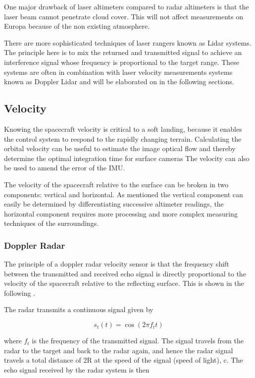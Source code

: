 One major drawback of laser altimeters compared to radar altimeters is that the laser beam cannot penetrate cloud cover. This will not affect measurements on Europa because of the non existing atmosphere. 

There are more sophisticated techniques of laser rangers known as Lidar systems. The principle here is to mix the returned and transmitted signal to achieve an interference signal whose frequency is proportional to the target range. These systems are often in combination with laser velocity measurements systems known as Doppler Lidar and will be elaborated on in the following sections. 




\subsection{Velocity}

Knowing the spacecraft velocity is critical to a soft landing, because it enables the control system to respond to the rapidly changing terrain. Calculating the orbital velocity can be useful to estimate the image optical flow and thereby determine the optimal integration time for surface cameras \cite{alessandro} The velocity can also be used to amend the error of the IMU.

The velocity of the spacecraft relative to the surface can be broken in two components: vertical and horizontal. As mentioned the vertical component can easily be determined by differentiating successive altimeter readings, the horizontal component requires more processing and more complex measuring techniques of the surroundings. 

\subsubsection{Doppler Radar}
The principle of a doppler radar velocity sensor is that the frequency shift between the transmitted and received echo signal is directly proportional to the velocity of the spacecraft relative to the reflecting surface. This is shown in the following \cite{henningdoppler}. 

The radar transmits a continuous signal given by

\begin{equation}
s_t(t)=\cos (2 \pi f_t t)
\end{equation}


where $f_t$ is the frequency of the transmitted signal. The signal travels
from the radar to the target and back to the radar again, and hence the radar signal
travels a total distance of 2R at the speed of the signal (speed of light), c. The echo signal received by the radar
system is then

